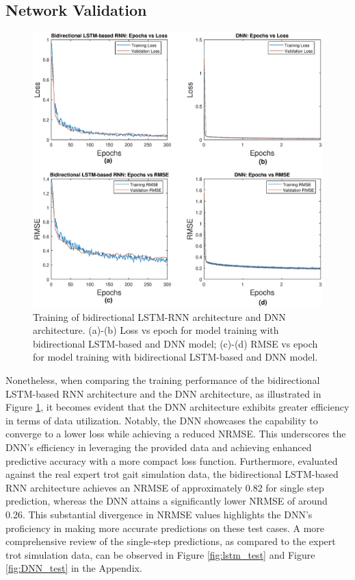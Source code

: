 \subsection{Network Validation}
\begin{figure}[htb]
    \centering
    \includegraphics[width=\linewidth]{img/chap4/train_result.eps}
    \caption{Training of bidirectional LSTM-RNN architecture and DNN architecture. (a)-(b) Loss vs epoch for model training with bidirectional LSTM-based and DNN model; (c)-(d) RMSE vs epoch for model training with bidirectional LSTM-based and DNN model.}
    \label{fig:train2net}
\end{figure}

Nonetheless, when comparing the training performance of the bidirectional LSTM-based RNN architecture and the DNN architecture, as illustrated in Figure \ref{fig:train2net}, it becomes evident that the DNN architecture exhibits greater efficiency in terms of data utilization. Notably, the DNN showcases the capability to converge to a lower loss while achieving a reduced \ac{NRMSE}. This underscores the DNN's efficiency in leveraging the provided data and achieving enhanced predictive accuracy with a more compact loss function. Furthermore, evaluated against the real expert trot gait simulation data, the bidirectional LSTM-based RNN architecture achieves an NRMSE of approximately 0.82 for single step prediction, whereas the DNN attains a significantly lower NRMSE of around 0.26. This substantial divergence in NRMSE values highlights the DNN's proficiency in making more accurate predictions on these test cases. A more comprehensive review of the single-step predictions, as compared to the expert trot simulation data, can be observed in Figure \ref{fig:lstm_test} and Figure \ref{fig:DNN_test} in the Appendix. 

